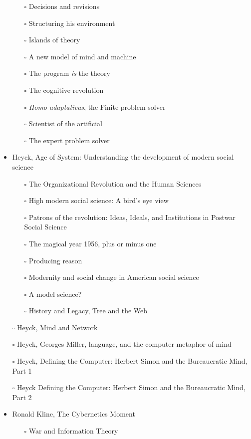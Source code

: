 \documentclass[paper=B6,portrait,twoside=true,twocolumn=false,headinclude=true,footinclude=false,fontsize=12,BCOR=10mm,DIV=calc,pagesize=auto,titlepage=firstiscover,mpinclude=false,headings=normal,headings=twolinechapter,open=right,toc=graduated,chapterprefix=false,numbers=endperiod,parskip=half+]{scrbook}
\theoremstyle{definition}
\begin{document}
\begin{itemize}
\begin{itemize}
\item[{$\square$}] Decisions and revisions
\item[{$\square$}] Structuring his environment
\item[{$\square$}] Islands of theory
\item[{$\square$}] A new model of mind and machine
\item[{$\square$}] The program \emph{is} the theory
\item[{$\square$}] The cognitive revolution
\item[{$\square$}] \emph{Homo adaptativus}, the Finite problem solver
\item[{$\square$}] Scientist of the artificial
\item[{$\square$}] The expert problem solver
\end{itemize}
\item\relax [0/8] Heyck, Age of System: Understanding the development of modern social science
\begin{itemize}
\item[{$\square$}] The Organizational Revolution and the Human Sciences
\item[{$\square$}] High modern social science: A bird's eye view
\item[{$\square$}] Patrons of the revolution: Ideas, Ideals, and Institutions in Postwar Social Science
\item[{$\square$}] The magical year 1956, plus or minus one
\item[{$\square$}] Producing reason
\item[{$\square$}] Modernity and social change in American social science
\item[{$\square$}] A model science?
\item[{$\square$}] History and Legacy, Tree and the Web
\end{itemize}
\item[{$\square$}] Heyck, Mind and Network
\item[{$\square$}] Heyck, Georges Miller, language, and the computer metaphor of mind
\item[{$\square$}] Heyck, Defining the Computer: Herbert Simon and the Bureaucratic Mind, Part 1
\item[{$\square$}] Heyck Defining the Computer: Herbert Simon and the Bureaucratic Mind, Part 2
\item\relax [0/9] Ronald Kline, The Cybernetics Moment
\begin{itemize}
\item[{$\square$}] War and Information Theory

\end{itemize}
\end{itemize}
\end{document}
